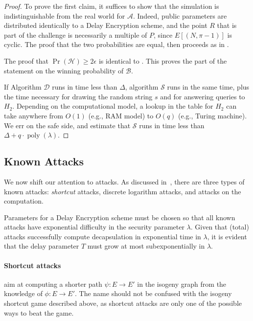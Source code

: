 \documentclass{llncs}
\DeclareMathOperator{\poly}{poly}
\begin{document}
\begin{proof}
  To prove the first claim, it suffices to show that the simulation is
  indistinguishable from the real world for $\mathcal{A}$. %
  Indeed, public parameters are distributed identically to a Delay
  Encryption scheme, and the point $R$ that is part of the challenge
  is necessarily a multiple of $P$, since $E[(N,\pi-1)]$ is cyclic. %
  The proof that the two probabilities are equal, then proceeds as in
  \cite[Lemma~4.3, Claim~1]{doi:10.1137/S0097539701398521}.

  The proof that $\Pr(\mathcal{H})\ge 2\epsilon$ is identical to
  \cite[Lemma~4.3, Claim~2]{doi:10.1137/S0097539701398521}. %
  This proves the part of the statement on the winning probability of
  $\mathcal{B}$.
  
  If Algorithm $\mathcal{D}$ runs in time less than $\Delta$,
  algorithm $\mathcal{S}$ runs in the same time, plus the time
  necessary for drawing the random string $s$ and for answering
  queries to $H_2$. %
  Depending on the computational model, a lookup in the table for
  $H_2$ can take anywhere from $O(1)$ (e.g., RAM model) to $O(q)$
  (e.g., Turing machine). %
  We err on the safe side, and estimate that $\mathcal{S}$ runs in
  time less than $\Delta + q\cdot\poly(\lambda)$.
\end{proof}


\subsection{Known Attacks}
We now shift our attention to attacks. %
As discussed in~\cite{10.1007/978-3-030-34578-5_10}, there are three
types of known attacks: \emph{shortcut} attacks, discrete logarithm
attacks, and attacks on the computation.

Parameters for a Delay Encryption scheme must be chosen so that all
known attacks have exponential difficulty in the security parameter
$\lambda$. %
Given that (total) attacks successfully compute decapsulation in
exponential time in $\lambda$, it is evident that the delay parameter
$T$ must grow at most subexponentially in $\lambda$.

\paragraph{Shortcut attacks} aim at computing a shorter path
$\psi:E\to E'$ in the isogeny graph from the knowledge of
$\phi:E\to E'$. %
The name should not be confused with the isogeny shortcut game
described above, as shortcut attacks are only one of the possible ways
to beat the game.
\end{document}
